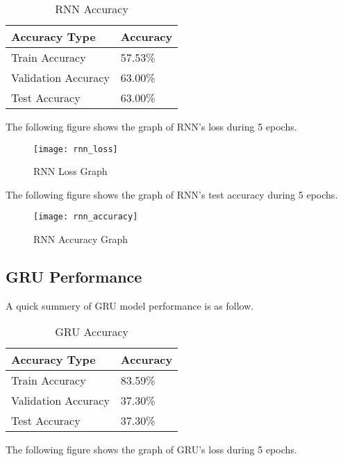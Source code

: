 		\begin{table}[H]
			\centering
			\begin{tabular}{|l|l|}
				\hline
				Accuracy Type       & Accuracy \\ \hline
				Train Accuracy      & 57.53\%  \\ \hline
				Validation Accuracy & 63.00\%  \\ \hline
				Test Accuracy       & 63.00\%  \\ \hline
			\end{tabular}
			\caption{RNN Accuracy}
		\end{table}
		
		
		The following figure shows the graph of RNN's loss during 5 epochs.\\
		
		\begin{figure}[H]
			\centering
			\texttt{[image: rnn\_loss]}
			\caption{RNN Loss Graph}
		\end{figure}
		\vline
		
		The following figure shows the graph of RNN's test accuracy during 5 epochs.\\
		\begin{figure}[H]
			\centering
			\texttt{[image: rnn\_accuracy]}
			\caption{RNN Accuracy Graph}
		\end{figure}
		\vline
		
		
		\subsection{GRU Performance}
		A quick summery of GRU model performance is as follow. \\
		
		\begin{table}[H]
			\centering
			\begin{tabular}{|l|l|}
				\hline
				Accuracy Type       & Accuracy \\ \hline
				Train Accuracy      & 83.59\%  \\ \hline
				Validation Accuracy & 37.30\%  \\ \hline
				Test Accuracy       & 37.30\% \\ \hline
			\end{tabular}
			\caption{GRU Accuracy}
		\end{table}
		
		
		The following figure shows the graph of GRU's loss during 5 epochs.\\
		
